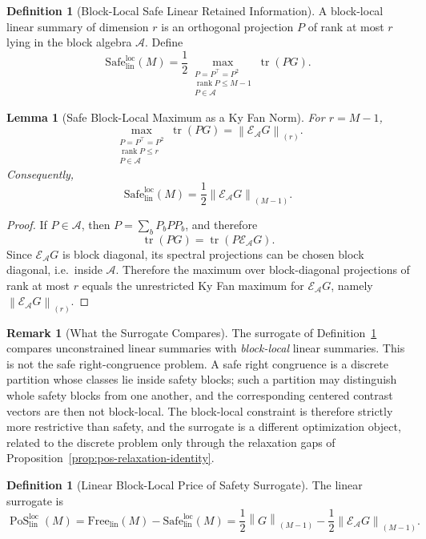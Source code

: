 \documentclass[12pt]{article}
\newtheorem{lemma}[theorem]{Lemma}
\theoremstyle{definition}
\newtheorem{definition}[theorem]{Definition}
\newtheorem{remark}[theorem]{Remark}
\DeclareMathOperator{\rank}{rank}
\DeclareMathOperator{\tr}{tr}
\DeclareMathOperator{\PoS}{PoS}
\newcommand{\EA}{\mathcal E_{\mathcal A}}
\newcommand{\KyF}[2]{\left\|#1\right\|_{(#2)}}
\newcommand{\PoSlin}{\PoS_{\mathrm{lin}}^{\mathrm{loc}}}
\begin{document}
\begin{definition}[Block-Local Safe Linear Retained Information]
\label{def:safe-linear-local}
A block-local linear summary of dimension $r$ is an orthogonal projection $P$
of rank at most $r$ lying in the block algebra $\mathcal A$.  Define
\[
\mathrm{Safe}_{\mathrm{lin}}^{\mathrm{loc}}(M)
=
\frac12
\max_{\substack{
P=P^\top=P^2\\
\rank P\le M-1\\
P\in\mathcal A
}}
\tr(PG).
\]
\end{definition}

\begin{lemma}[Safe Block-Local Maximum as a Ky Fan Norm]
\label{lem:safe-local-kyfan}
For $r=M-1$,
\[
\max_{\substack{
P=P^\top=P^2\\
\rank P\le r\\
P\in\mathcal A
}}
\tr(PG)
=
\KyF{\EA G}{r}.
\]
Consequently,
\[
\mathrm{Safe}_{\mathrm{lin}}^{\mathrm{loc}}(M)
=
\frac12
\KyF{\EA G}{M-1}.
\]
\end{lemma}

\begin{proof}
If $P\in\mathcal A$, then $P=\sum_b P_bPP_b$, and therefore
\[
\tr(PG)
=
\tr(P\EA G).
\]
Since $\EA G$ is block diagonal, its spectral projections can be chosen block
diagonal, i.e.\ inside $\mathcal A$.  Therefore the maximum over block-diagonal
projections of rank at most $r$ equals the unrestricted Ky Fan maximum for
$\EA G$, namely $\KyF{\EA G}{r}$.
\end{proof}

\begin{remark}[What the Surrogate Compares]
\label{rem:poslin-measures}
The surrogate of Definition~\ref{def:poslin} compares unconstrained linear
summaries with \emph{block-local} linear summaries.  This is not the safe
right-congruence problem.  A safe right congruence is a discrete partition
whose classes lie inside safety blocks; such a partition may distinguish whole
safety blocks from one another, and the corresponding centered contrast vectors
are then not block-local.  The block-local constraint is therefore strictly
more restrictive than safety, and the surrogate is a different optimization
object, related to the discrete problem only through the relaxation gaps of
Proposition~\ref{prop:pos-relaxation-identity}.
\end{remark}

\begin{definition}[Linear Block-Local Price of Safety Surrogate]
\label{def:poslin}
The linear surrogate is
\[
\PoSlin(M)
=
\mathrm{Free}_{\mathrm{lin}}(M)
-
\mathrm{Safe}_{\mathrm{lin}}^{\mathrm{loc}}(M)
=
\frac12
\KyF{G}{M-1}
-
\frac12
\KyF{\EA G}{M-1}.
\]
\end{definition}
\end{document}
